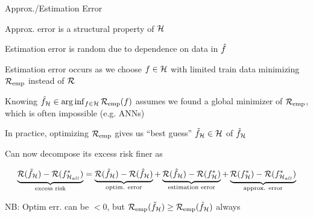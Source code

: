 \documentclass[11pt,compress,t,notes=noshow, xcolor=table]{beamer}
\begin{document}
\begin{framei}[sep=M]{Approx./Estimation Error }

\item Approx. error is a structural property of $\mathcal{H}$
\item Estimation error is random due to dependence on data in $\hat{f}$
\item Estimation error occurs as we choose $f \in \mathcal{H}$ with limited train data minimizing $\mathcal{R}_{\text{emp}}$ instead of $\mathcal{R}$

\item Knowing $\hat{f}_{\mathcal{H}} \in \arg\inf_{f \in \mathcal{H}} \mathcal{R}_{\text{emp}}(f)$ assumes we found a global minimizer of $\mathcal{R}_{\text{emp}}$, which is often impossible (e.g. ANNs) 

\item In practice, optimizing $\mathcal{R}_{\text{emp}}$ gives us ``best guess'' $\tilde{f}_{\mathcal{H}} \in \mathcal{H}$ of $\hat{f}_{\mathcal{H}}$ 

\item Can now decompose its excess risk finer as

$$
\underbrace{\mathcal{R}(\tilde{f}_{\mathcal{H}}) - \mathcal{R}(f^{\ast}_{\mathcal{H}_{all}})}_{\text{excess risk}} = \underbrace{\mathcal{R}(\tilde{f}_{\mathcal{H}}) - \mathcal{R}(\hat{f}_{\mathcal{H}})}_{\text{optim. error}} + \underbrace{\mathcal{R}(\hat{f}_{\mathcal{H}}) - \mathcal{R}(f^{\ast}_{\mathcal{H}})}_{\text{estimation error}} + \underbrace{\mathcal{R}(f^{\ast}_{\mathcal{H}}) -  \mathcal{R}(f^{\ast}_{\mathcal{H}_{all}})}_{\text{approx. error}} 
$$

\item NB: Optim err. can be $< 0$, but $\mathcal{R}_{\text{emp}}(\tilde{f}_{\mathcal{H}}) \geq \mathcal{R}_{\text{emp}}(\hat{f}_{\mathcal{H}})$ always

\end{framei}
\end{document}
